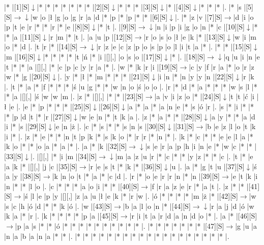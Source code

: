 \documentclass[11pt]{article}
\newcommand\drarr{$\rightarrow \!\!\!\!\! \downarrow$}
\newcommand\rarr{$\rightarrow$}
\newcommand\darr{$\downarrow$}
\begin{document}
\noindent\begin{Puzzle}{18}{31}|*	|[1][S]\darr	|*	|*	|*	|*	|*	|*	|*	|[2][S]\darr	|*	|*	|*	|[3][S]\darr	|*	|[4][S]\darr	|*	|*	|*	|.
|*	|s	|[5][S]\drarr	|w	|o	|ł	|g	|o	|g	|r	|a	|d	|*	|p	|*	|p	|*	|*	|[6][S]\darr	|.
|*	|z	|v	|[7][S]\rarr	|d	|i	|o	|p	|t	|e	|r	|*	|*	|r	|*	|e	|[8][S]\darr	|*	|t	|.
|[9][S]\drarr	|n	|i	|p	|i	|g	|o	|n	|*	|c	|[10][S]\darr	|*	|*	|a	|[11][S]\darr	|r	|m	|*	|t	|.
|a	|u	|p	|[12][S]\rarr	|r	|o	|s	|o	|ł	|e	|k	|*	|[13][S]\darr	|w	|i	|m	|o	|*	|d	|.
|t	|r	|*	|[14][S]\drarr	|r	|z	|e	|c	|z	|p	|o	|s	|p	|o	|l	|i	|t	|a	|*	|.
|*	|*	|[15][S]\darr	|m	|[16][S]\darr	|*	|*	|*	|*	|t	|ń	|*	|i	|[][,]{ }	|o	|s	|o	|[17][S]\darr	|*	|.
|[18][S]\drarr	|q	|u	|i	|n	|e	|t	|*	|*	|a	|[][,]{ }	|*	|c	|p	|c	|y	|r	|a	|*	|.
|w	|*	|k	|r	|i	|[19][S]\rarr	|c	|y	|f	|r	|a	|*	|o	|r	|z	|w	|*	|g	|[20][S]\darr	|.
|y	|*	|ł	|*	|m	|*	|*	|*	|[21][S]\darr	|i	|n	|*	|n	|y	|y	|n	|[22][S]\darr	|r	|k	|.
|t	|*	|a	|*	|f	|*	|*	|*	|ś	|u	|g	|*	|*	|w	|n	|o	|ś	|o	|o	|.
|r	|*	|d	|*	|a	|*	|*	|*	|w	|s	|l	|*	|*	|a	|[][,]{ }	|ś	|w	|w	|m	|.
|z	|*	|[][,]{ }	|*	|*	|[23][S]\rarr	|a	|v	|i	|z	|o	|*	|[24][S]\darr	|t	|t	|ć	|i	|ł	|e	|.
|e	|*	|p	|*	|*	|*	|[25][S]\darr	|[26][S]\darr	|a	|*	|a	|*	|a	|n	|e	|*	|s	|ó	|r	|.
|s	|*	|i	|*	|*	|*	|p	|d	|t	|*	|r	|[27][S]\darr	|w	|e	|n	|*	|t	|k	|a	|.
|z	|*	|a	|*	|*	|[28][S]\darr	|a	|y	|*	|*	|a	|d	|i	|*	|s	|[29][S]\darr	|e	|n	|ż	|.
|c	|*	|s	|*	|*	|s	|n	|s	|[30][S]\darr	|[31][S]\rarr	|b	|e	|z	|l	|o	|t	|k	|i	|*	|.
|z	|*	|e	|*	|*	|n	|t	|p	|k	|*	|s	|k	|o	|*	|r	|r	|*	|n	|*	|.
|k	|*	|c	|*	|*	|e	|e	|l	|a	|*	|k	|o	|*	|*	|o	|a	|*	|a	|*	|.
|a	|*	|k	|[32][S]\drarr	|s	|e	|r	|a	|p	|h	|i	|n	|e	|*	|w	|c	|*	|*	|[33][S]\darr	|.
|[][,]{ }	|*	|i	|m	|[34][S]\drarr	|m	|a	|z	|u	|r	|*	|c	|*	|*	|y	|z	|*	|*	|c	|.
|t	|*	|e	|a	|k	|*	|[][,]{ }	|j	|c	|[35][S]\rarr	|r	|e	|s	|t	|*	|k	|*	|[36][S]\darr	|u	|.
|a	|*	|g	|t	|u	|[37][S]\darr	|ś	|a	|y	|[38][S]\rarr	|k	|n	|o	|t	|*	|a	|*	|c	|d	|.
|r	|*	|o	|e	|r	|r	|n	|*	|n	|[39][S]\rarr	|e	|t	|k	|i	|n	|*	|*	|l	|o	|.
|c	|*	|*	|*	|a	|o	|i	|*	|*	|[40][S]\rarr	|f	|r	|a	|z	|e	|r	|*	|a	|t	|.
|z	|*	|*	|[41][S]\rarr	|ś	|l	|e	|p	|y	|[][,]{ }	|z	|a	|u	|ł	|e	|k	|*	|r	|w	|.
|ó	|*	|*	|*	|*	|m	|ż	|*	|[42][S]\rarr	|w	|s	|c	|h	|ó	|d	|*	|*	|k	|ó	|.
|w	|[43][S]\rarr	|b	|a	|l	|o	|n	|*	|[44][S]\drarr	|r	|a	|j	|d	|ó	|w	|k	|a	|*	|r	|.
|k	|*	|*	|*	|*	|p	|a	|[45][S]\rarr	|r	|i	|t	|a	|r	|d	|a	|n	|d	|o	|*	|.
|a	|*	|[46][S]\rarr	|p	|a	|s	|*	|*	|ó	|*	|*	|*	|*	|*	|*	|*	|*	|*	|*	|.
|*	|*	|*	|*	|*	|*	|*	|[47][S]\rarr	|g	|u	|a	|n	|a	|b	|a	|n	|a	|*	|*	|.
|*	|*	|*	|*	|*	|*	|*	|*	|*	|*	|*	|*	|*	|*	|*	|*	|*	|*	|*	|.\end{Puzzle}
\end{document}
